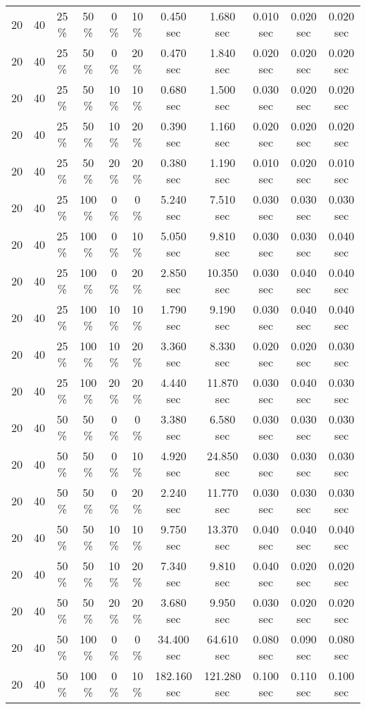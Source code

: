 \documentclass{article}
\begin{document}
\begin{longtable}[]{@{}ccccccccccc@{}}
20 & 40 & 25 \% & 50 \% & 0 \% & 10 \% & 0.450 sec & 1.680 sec & 0.010 sec & 0.020 sec & 0.020 sec \\
20 & 40 & 25 \% & 50 \% & 0 \% & 20 \% & 0.470 sec & 1.840 sec & 0.020 sec & 0.020 sec & 0.020 sec \\
20 & 40 & 25 \% & 50 \% & 10 \% & 10 \% & 0.680 sec & 1.500 sec & 0.030 sec & 0.020 sec & 0.020 sec \\
20 & 40 & 25 \% & 50 \% & 10 \% & 20 \% & 0.390 sec & 1.160 sec & 0.020 sec & 0.020 sec & 0.020 sec \\
20 & 40 & 25 \% & 50 \% & 20 \% & 20 \% & 0.380 sec & 1.190 sec & 0.010 sec & 0.020 sec & 0.010 sec \\
20 & 40 & 25 \% & 100 \% & 0 \% & 0 \% & 5.240 sec & 7.510 sec & 0.030 sec & 0.030 sec & 0.030 sec \\
20 & 40 & 25 \% & 100 \% & 0 \% & 10 \% & 5.050 sec & 9.810 sec & 0.030 sec & 0.030 sec & 0.040 sec \\
20 & 40 & 25 \% & 100 \% & 0 \% & 20 \% & 2.850 sec & 10.350 sec & 0.030 sec & 0.040 sec & 0.040 sec \\
20 & 40 & 25 \% & 100 \% & 10 \% & 10 \% & 1.790 sec & 9.190 sec & 0.030 sec & 0.040 sec & 0.040 sec \\
20 & 40 & 25 \% & 100 \% & 10 \% & 20 \% & 3.360 sec & 8.330 sec & 0.020 sec & 0.020 sec & 0.030 sec \\
20 & 40 & 25 \% & 100 \% & 20 \% & 20 \% & 4.440 sec & 11.870 sec & 0.030 sec & 0.040 sec & 0.030 sec \\
20 & 40 & 50 \% & 50 \% & 0 \% & 0 \% & 3.380 sec & 6.580 sec & 0.030 sec & 0.030 sec & 0.030 sec \\
20 & 40 & 50 \% & 50 \% & 0 \% & 10 \% & 4.920 sec & 24.850 sec & 0.030 sec & 0.030 sec & 0.030 sec \\
20 & 40 & 50 \% & 50 \% & 0 \% & 20 \% & 2.240 sec & 11.770 sec & 0.030 sec & 0.030 sec & 0.030 sec \\
20 & 40 & 50 \% & 50 \% & 10 \% & 10 \% & 9.750 sec & 13.370 sec & 0.040 sec & 0.040 sec & 0.040 sec \\
20 & 40 & 50 \% & 50 \% & 10 \% & 20 \% & 7.340 sec & 9.810 sec & 0.040 sec & 0.020 sec & 0.020 sec \\
20 & 40 & 50 \% & 50 \% & 20 \% & 20 \% & 3.680 sec & 9.950 sec & 0.030 sec & 0.020 sec & 0.020 sec \\
20 & 40 & 50 \% & 100 \% & 0 \% & 0 \% & 34.400 sec & 64.610 sec & 0.080 sec & 0.090 sec & 0.080 sec \\
20 & 40 & 50 \% & 100 \% & 0 \% & 10 \% & 182.160 sec & 121.280 sec & 0.100 sec & 0.110 sec & 0.100 sec \\

\end{longtable}
\end{document}
